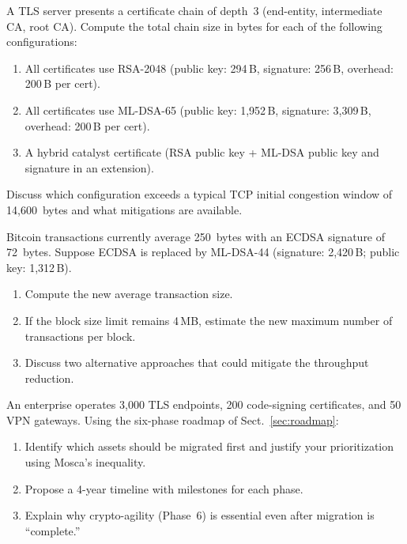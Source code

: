 \begin{prob}
\label{prob:ch13-cert-chain}
A TLS server presents a certificate chain of depth~3 (end-entity, intermediate CA, root CA).  Compute the total chain size in bytes for each of the following configurations:
\begin{enumerate}
\item[(a)] All certificates use RSA-2048 (public key: 294\,B, signature: 256\,B, overhead: 200\,B per cert).
\item[(b)] All certificates use ML-DSA-65 (public key: 1{,}952\,B, signature: 3{,}309\,B, overhead: 200\,B per cert).
\item[(c)] A hybrid catalyst certificate (RSA public key + ML-DSA public key and signature in an extension).
\end{enumerate}
Discuss which configuration exceeds a typical TCP initial congestion window of 14{,}600~bytes and what mitigations are available.
\end{prob}

\begin{prob}
\label{prob:ch13-blockchain}
Bitcoin transactions currently average 250~bytes with an ECDSA signature of 72~bytes.  Suppose ECDSA is replaced by ML-DSA-44 (signature: 2{,}420\,B; public key: 1{,}312\,B).
\begin{enumerate}
\item[(a)] Compute the new average transaction size.
\item[(b)] If the block size limit remains 4\,MB, estimate the new maximum number of transactions per block.
\item[(c)] Discuss two alternative approaches that could mitigate the throughput reduction.
\end{enumerate}
\end{prob}

\begin{prob}
\label{prob:ch13-roadmap}
An enterprise operates 3{,}000 TLS endpoints, 200 code-signing certificates, and 50 VPN gateways.  Using the six-phase roadmap of Sect.~\ref{sec:roadmap}:
\begin{enumerate}
\item[(a)] Identify which assets should be migrated first and justify your prioritization using Mosca's inequality.
\item[(b)] Propose a 4-year timeline with milestones for each phase.
\item[(c)] Explain why crypto-agility (Phase~6) is essential even after migration is ``complete.''
\end{enumerate}
\end{prob}
